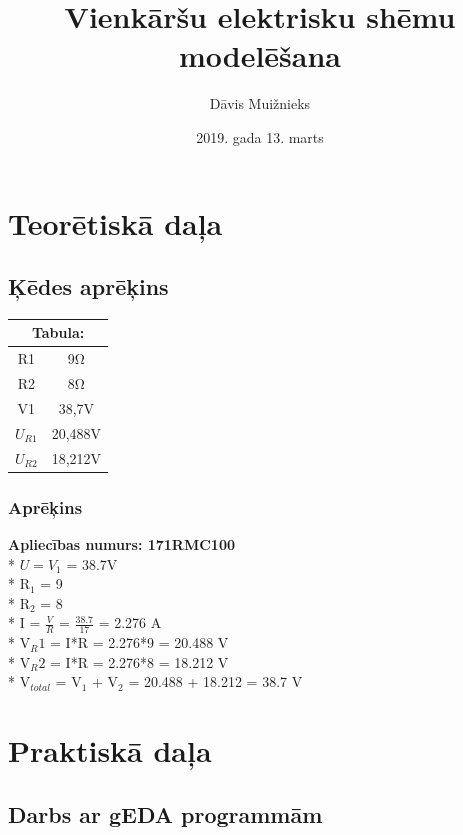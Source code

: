\documentclass {report}
\title{Vienkāršu elektrisku shēmu modelēšana}
\author{Dāvis Muižnieks}
\date{2019. gada 13. marts}
\begin{document}
\maketitle
\chapter{Teorētiskā daļa}
\section{Ķēdes aprēķins}

\begin{center}
\small\addtolength{\tabcolsep}{10pt}
\begin{tabular}{|c|c|}
    \hline \multicolumn{2}{|c|}{Tabula:} \\
\hline
R1 & 9Ω\\
\hline
R2 & 8Ω\\
\hline
V1 & 38,7V\\
\hline
$U_{R1}$ & 20,488V\\
\hline
$U_{R2}$ & 18,212V\\
\hline
\end{tabular}
\end{center}
\subsection{Aprēķins}
\textbf{Apliecības numurs: 171RMC100}\\
* $U=V_{1}$ = 38.7V\\
* R$_{1}$ = 9\\
* R$_{2}$ = 8\\
* I = \( \frac{V}{R} \) = \( \frac{38.7}{17}\) = 2.276 A\\
* V$_{R}{1}$ = I*R = 2.276*9 = 20.488 V\\
* V$_{R}{2}$ = I*R = 2.276*8 = 18.212 V\\
* V$_{total}$ = V$_{1}$ + V$_{2}$ = 20.488 + 18.212 = 38.7 V\\

\chapter{Praktiskā daļa}
\section{Darbs ar gEDA programmām}
\end{document}
